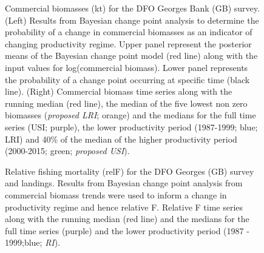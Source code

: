 \documentclass[11pt]{article}
\newcommand{\e}{/backup/bio_data/bio.lobster/figures/} %
\begin{document}
\begin{landscape}
\begin{figure}
\centering
       \caption{Commercial biomasses (kt) for the DFO Georges Bank (GB) survey. (Left) Results from Bayesian change point analysis to determine the probability of a change in commercial biomasses as an indicator of changing productivity regime. Upper panel represent the posterior means of the Bayesian change point model (red line) along with the input values for log(commercial biomass). Lower panel represents the probability of a change point occurring at specific time (black line). (Right) Commercial biomass time series along with the running median (red line), the median of the five lowest non zero biomasses (\emph{proposed LRI}; orange) and the medians for the full time series (USI; purple), the lower productivity period (1987-1999; blue; LRI) and 40\% of the median of the higher productivity period (2000-2015; green; \emph{proposed USI}). }

\end{figure}
\end{landscape}
     \clearpage

\begin{figure}
\centering
       \caption{Relative fishing mortality (relF) for the DFO Georges (GB) survey and landings. Results from Bayesian change point analysis from commercial biomass trends were used to inform a change in productivity regime and hence relative F. Relative F time series along with the running median (red line) and the medians for the full time series (purple) and the lower productivity period (1987 - 1999;blue; \emph{RI}). }
\end{figure}
     \clearpage
\end{document}
